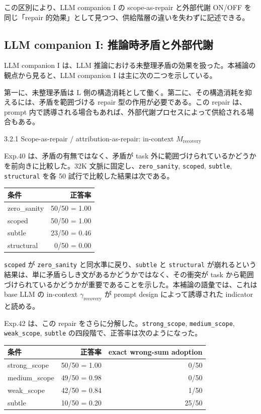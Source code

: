 \documentclass[12pt,a4paper]{article}
\begin{document}
この区別により、LLM companion I の scope-as-repair と外部代謝 ON/OFF を同じ「repair 的効果」として見つつ、供給階層の違いを失わずに記述できる。

\subsection{LLM companion I: 推論時矛盾と外部代謝}\label{llm-companion-i-ux63a8ux8ad6ux6642ux77dbux76feux3068ux5916ux90e8ux4ee3ux8b1d}

LLM companion I は、LLM 推論における未整理矛盾の効果を扱った。本補論の観点から見ると、LLM companion I は主に次の二つを示している。

第一に、未整理矛盾は L 側の構造消耗として働く。第二に、その構造消耗を抑えるには、矛盾を範囲づける repair 型の作用が必要である。この repair は、prompt 内で誘導される場合もあれば、外部代謝プロセスによって供給される場合もある。

3.2.1 Scope-as-repair / attribution-as-repair: in-context \(M_{\mathrm{recovery}}\)

Exp.40 は、矛盾の有無ではなく、矛盾が task 外に範囲づけられているかどうかを前向きに比較した。32K 文脈に固定し、\texttt{zero\_sanity}, \texttt{scoped}, \texttt{subtle}, \texttt{structural} を各 50 試行で比較した結果は次である。

{\def\LTcaptype{table} %
\begin{longtable}[]{@{}lr@{}}
\toprule\noalign{}
条件 & 正答率 \\
\midrule\noalign{}
\endhead
\bottomrule\noalign{}
\endlastfoot
zero\_sanity & 50/50 = 1.00 \\
scoped & 50/50 = 1.00 \\
subtle & 23/50 = 0.46 \\
structural & 0/50 = 0.00 \\
\end{longtable}
}

\texttt{scoped} が \texttt{zero\_sanity} と同水準に戻り、\texttt{subtle} と \texttt{structural} が崩れるという結果は、単に矛盾らしき文があるかどうかではなく、その衝突が task から範囲づけられているかどうかが重要であることを示した。本補論の語彙では、これは base LLM の in-context \(\gamma_{\mathrm{recovery}}\) が prompt design によって誘導された indicator と読める。

Exp.42 は、この repair をさらに分解した。\texttt{strong\_scope}, \texttt{medium\_scope}, \texttt{weak\_scope}, \texttt{subtle} の四段階で、正答率は次のようになった。

{\def\LTcaptype{table} %
\begin{longtable}[]{@{}lrr@{}}
\toprule\noalign{}
条件 & 正答率 & exact wrong-sum adoption \\
\midrule\noalign{}
\endhead
\bottomrule\noalign{}
\endlastfoot
strong\_scope & 50/50 = 1.00 & 0/50 \\
medium\_scope & 49/50 = 0.98 & 0/50 \\
weak\_scope & 42/50 = 0.84 & 1/50 \\
subtle & 10/50 = 0.20 & 25/50 \\
\end{longtable}
}
\end{document}
